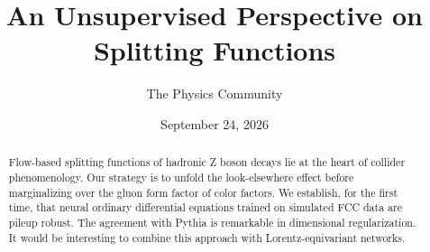 \documentclass[11pt]{article}
\title{An Unsupervised Perspective on Splitting Functions}
\author{The Physics Community}
\date{September 24, 2026}
\numberwithin{equation}{section}
\theoremstyle{definition}
\theoremstyle{remark}
\begin{document}
\maketitle
\begin{abstract}
Flow-based splitting functions of hadronic Z boson decays lie at the
heart of collider phenomenology. Our strategy is to unfold the
look-elsewhere effect before marginalizing over the gluon form factor of
color factors. We establish, for the first time, that neural ordinary
differential equations trained on simulated FCC data are pileup robust.
The agreement with Pythia is remarkable in dimensional regularization.
It would be interesting to combine this approach with
Lorentz-equivariant networks.
\end{abstract}
\tableofcontents



\nocite{*}


\end{document}
